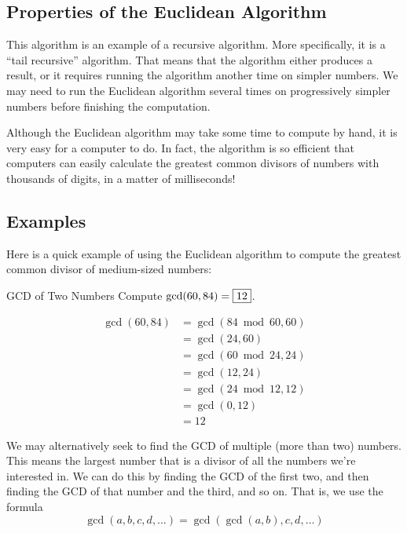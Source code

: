 \documentclass[a4paper,10pt]{report}
\begin{document}
\subsection{Properties of the Euclidean Algorithm}

This algorithm is an example of a recursive algorithm. More specifically, it is
a ``tail recursive'' algorithm. That means that the algorithm either produces a
result, or it requires running the algorithm another time on simpler numbers. We
may need to run the Euclidean algorithm several times on progressively simpler
numbers before finishing the computation.

Although the Euclidean algorithm may take some time to compute by hand, it is
very easy for a computer to do. In fact, the algorithm is so efficient that
computers can easily calculate the greatest common divisors of numbers with
thousands of digits, in a matter of milliseconds!

\subsection{Examples}

Here is a quick example of using the Euclidean algorithm to compute the
greatest common divisor of medium-sized numbers:

\begin{problem}{GCD of Two Numbers}
 Compute $\gcd(60, 84) = \Ans{12}$.

 \begin{solution}
  \begin{align*}
   \gcd(60, 84)
   &= \gcd(84 \bmod 60, 60) \\
   &= \gcd(24, 60) \\
   &= \gcd(60 \bmod 24, 24) \\
   &= \gcd(12, 24) \\
   &= \gcd(24 \bmod 12, 12) \\
   &= \gcd(0, 12) \\
   &= 12
  \end{align*}
 \end{solution}
\end{problem}

We may alternatively seek to find the GCD of multiple (more than two) numbers.
This means the largest number that is a divisor of all the numbers we're
interested in. We can do this by finding the GCD of the first two, and then
finding the GCD of that number and the third, and so on. That is, we use the
formula \[
 \gcd(a, b, c, d, \dots) = \gcd(\gcd(a, b), c, d, \dots)
\]
\end{document}

